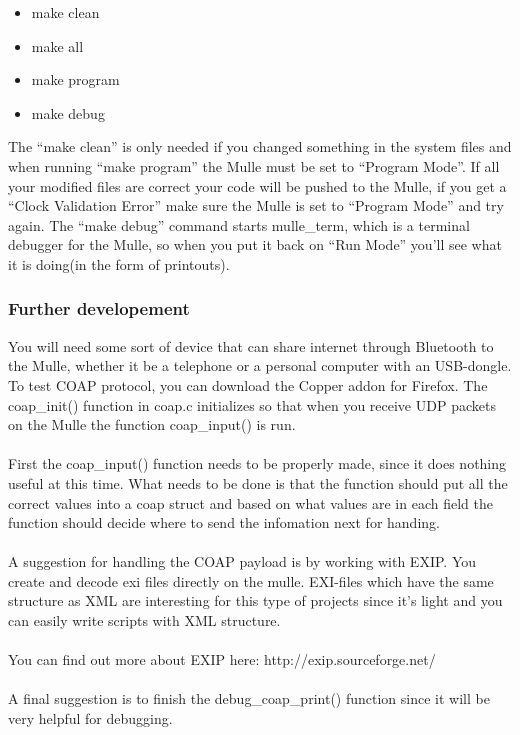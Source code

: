 \begin{itemize}
\item make clean
\item make all
\item make program
\item make debug
\end{itemize}
The “make clean” is only needed if you changed something in the system files and when running “make program” the Mulle must be set to “Program Mode”. If all your modified files are correct your code will be pushed to the Mulle, if you get a “Clock Validation Error” make sure the Mulle is set to “Program Mode” and try again. The “make debug” command starts mulle\_term, which is a terminal debugger for the Mulle, so when you put it back on “Run Mode” you'll see what it is doing(in the form of printouts).

\subsubsection{Further developement}

You will need some sort of device that can share internet through Bluetooth to the Mulle, whether it be a telephone or a personal computer with an USB-dongle. To test COAP protocol, you can download the Copper addon for Firefox. The coap\_init() function in coap.c initializes so that when you receive UDP packets on the Mulle the function coap\_input() is run.
\\\\
First the coap\_input() function needs to be properly made, since it does nothing useful at this time. What needs to be done is that the function should put all the correct values into a coap struct and based on what values are in each field the function should decide where to send the infomation next for handing. 
\\\\
A suggestion for handling the COAP payload is by working with EXIP. You create and decode exi files directly on the mulle. EXI-files which have the same structure as XML are interesting for this type of projects since it's light and you can easily write scripts with XML structure.
\\\\
You can find out more about EXIP here: http://exip.sourceforge.net/
\\\\
A final suggestion is to finish the debug\_coap\_print() function since it will be very helpful for debugging.

